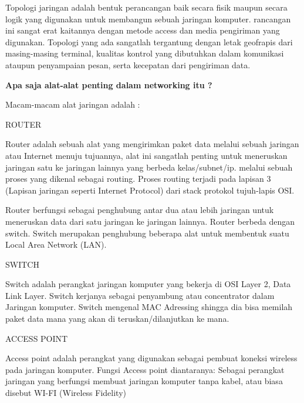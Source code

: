 \documentclass[a4paper,12pt]{report}
\begin{document}
\vspace{12pt}
Topologi jaringan adalah bentuk perancangan baik secara fisik maupun secara logik yang digunakan untuk membangun sebuah jaringan komputer. rancangan ini sangat erat kaitannya dengan metode access dan media pengiriman yang digunakan. Topologi yang ada sangatlah tergantung dengan letak geofrapis dari masing-masing terminal, kualitas kontrol yang dibutuhkan dalam komunikasi ataupun penyampaian pesan, serta kecepatan dari pengiriman data. \par
\noindent 
\textbf{Apa saja alat-alat penting dalam networking itu ?} \par
\noindent 
Macam-macam alat jaringan adalah :  \par
\noindent 
\begin{myEnumerate}
\item ROUTER  \par
Router adalah sebuah alat yang mengirimkan paket data melalui sebuah jaringan atau Internet menuju tujuannya, alat ini sangatlah penting untuk meneruskan jaringan satu ke jaringan lainnya yang berbeda kelas/subnet/ip. melalui sebuah proses yang dikenal sebagai routing. Proses routing terjadi pada lapisan 3 (Lapisan jaringan seperti Internet Protocol) dari stack protokol tujuh-lapis OSI. \par
\vspace{12pt}
Router berfungsi sebagai penghubung antar dua atau lebih jaringan untuk meneruskan data dari satu jaringan ke jaringan lainnya. Router berbeda dengan switch. Switch merupakan penghubung beberapa alat untuk membentuk suatu Local Area Network (LAN). \par
\vspace{12pt}
\noindent 
\item SWITCH \par
Switch adalah perangkat jaringan komputer yang bekerja di OSI Layer 2, Data Link Layer. Switch kerjanya sebagai penyambung atau concentrator dalam Jaringan komputer. Switch mengenal MAC Adressing shingga dia bisa memilah paket data mana yang akan di teruskan/dilanjutkan ke mana. \par
\vspace{12pt}
\noindent 
\item ACCESS POINT\end{myEnumerate}
 \par
Access point adalah perangkat yang digunakan sebagai pembuat koneksi wireless pada jaringan komputer. Fungsi Access point diantaranya: Sebagai perangkat jaringan yang berfungsi membuat jaringan komputer tanpa kabel, atau biasa disebut WI-FI (Wireless Fidelity) \par
\end{document}
